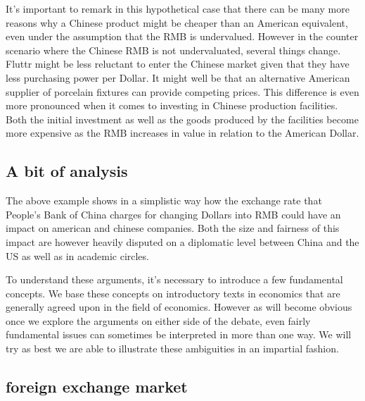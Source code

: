 \documentclass[11pt]{article}
\begin{document}

It's important to remark in this hypothetical case that there can be 
many more reasons why a Chinese product might be cheaper than an 
American equivalent, even under the assumption that the RMB is 
undervalued. However in the counter scenario where the Chinese RMB is 
not undervaluated, several things change. Fluttr might be less reluctant 
to enter the Chinese market given that they have less purchasing power 
per Dollar. It might well be that an alternative American supplier of 
porcelain fixtures can provide competing prices. This difference is even 
more pronounced when it comes to investing in Chinese production 
facilities. Both the initial investment as well as the goods produced by 
the facilities become more expensive as the RMB increases in value in 
relation to the American Dollar.

\subsection{A bit of analysis}

The above example shows in a simplistic way how the exchange rate that 
People's Bank of China charges for changing Dollars into RMB could have 
an impact on american and chinese companies. Both the size and fairness 
of this impact are however heavily disputed on a diplomatic level 
between China and the US as well as in academic circles.

To understand these arguments, it's necessary to introduce a few 
fundamental concepts. We base these concepts on introductory texts in 
economics that are generally agreed upon in the field of economics.  
However as will become obvious once we explore the arguments on either 
side of the debate, even fairly fundamental issues can sometimes be 
interpreted in more than one way. We will try as best we are able to 
illustrate these ambiguities in an impartial fashion.



\subsection{foreign exchange market}
\end{document}
